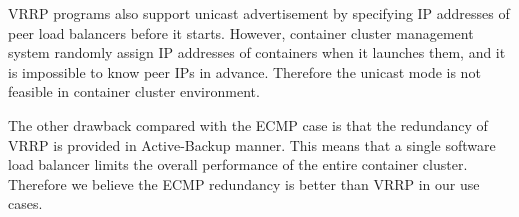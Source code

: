 VRRP programs also support unicast advertisement by specifying IP addresses of peer load balancers before it starts.
However, container cluster management system randomly assign IP addresses of containers when it launches them, and it is impossible to know peer IPs in advance. 
Therefore the unicast mode is not feasible in container cluster environment.

The other drawback compared with the ECMP case is that the redundancy of VRRP is provided in Active-Backup manner.
This means that a single software load balancer limits the overall performance of the entire container cluster.
Therefore we believe the ECMP redundancy is better than VRRP in our use cases.




